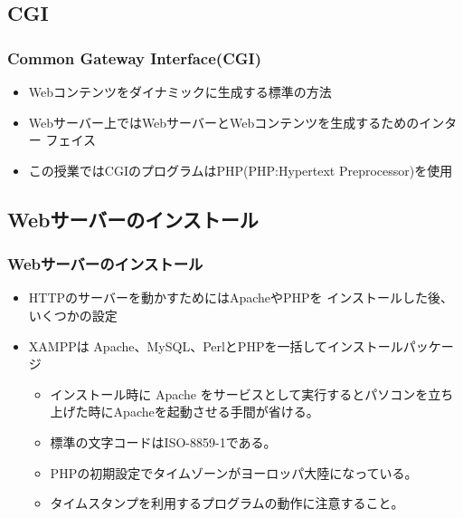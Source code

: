 \subsection{CGI}
\begin{frame}[containsverbatim]
\frametitle{Common Gateway Interface(CGI)}
\begin{itemize}
 \item Webコンテンツをダイナミックに生成する標準の方法
 \item Webサーバー上ではWebサーバーとWebコンテンツを生成するためのインター
       フェイス
 \item この授業ではCGIのプログラムはPHP(PHP:Hypertext Preprocessor)を使用
\end{itemize}
\end{frame}
\subsection{Webサーバーのインストール}
\begin{frame}[containsverbatim]
\frametitle{Webサーバーのインストール}
\begin{itemize}
 \item HTTPのサーバーを動かすためにはApacheやPHPを
インストールした後、いくつかの設定
 \item XAMPPは Apache、MySQL、PerlとPHPを一括してインストールパッケージ
\begin{itemize}
  \item インストール時に Apache をサービスとして実行するとパソコンを立ち
       上げた時にApacheを起動させる手間が省ける。
 \item 標準の文字コードは{ISO-8859-1}である。
 \item PHPの初期設定でタイムゾーンがヨーロッパ大陸になっている。
 \item タイムスタンプを利用するプログラムの動作に注意すること。
\end{itemize}
\end{itemize}
\end{frame}
